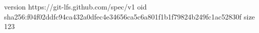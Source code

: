 version https://git-lfs.github.com/spec/v1
oid sha256:f04f02ddfc94ca432a0dfec4e34656ca5c6a801f1b1f79824b249fc1ac52830f
size 123
